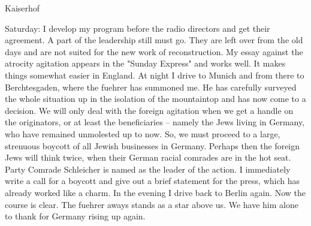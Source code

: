 Kaiserhof

Saturday: I develop my program before the radio directors and get their agreement. A part of the leadership still must go. They are left over from the old days and are not suited for the new work of reconstruction. My essay against the atrocity agitation appears in the "Sunday Express" and works well. It makes things somewhat easier in England. At night I drive to Munich and from there to Berchtesgaden, where the fuehrer has summoned me. He has carefully surveyed the whole situation up in the isolation of the mountaintop and has now come to a decision. We will only deal with the foreign agitation when we get a handle on the originators, or at least the beneficiaries -- namely the Jews living in Germany, who have remained unmolested up to now. So, we must proceed to a large, strenuous boycott of all Jewish businesses in Germany. Perhaps then the foreign Jews will think twice, when their German racial comrades are in the hot seat. Party Comrade Schleicher is named as the leader of the action. I immediately write a call for a boycott and give out a brief statement for the press, which has already worked like a charm. In the evening I drive back to Berlin again. Now the course is clear. The fuehrer aways stands as a star above us. We have him alone to thank for Germany rising up again.